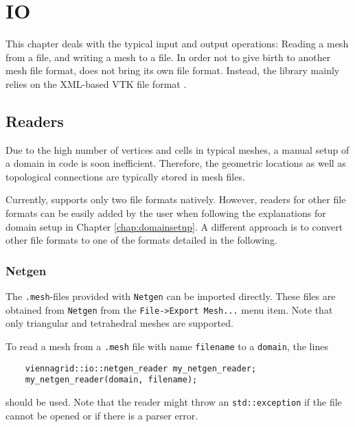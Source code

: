 \chapter{IO} \label{chap:io}
This chapter deals with the typical input and output operations: Reading a mesh from a file, and writing a mesh to a file.
In order not to give birth to another mesh file format, {\ViennaGrid} does not bring its own file format. 
Instead, the library mainly relies on the XML-based VTK \cite{VTK} file format \cite{VTKfileformat}.




\section{Readers}
Due to the high number of vertices and cells in typical meshes,
a manual setup of a domain in code is soon inefficient. Therefore,
the geometric locations as well as topological connections are typically stored in mesh files.

Currently, {\ViennaGrid} supports only two file formats natively. However, readers for other file formats
can be easily added by the user when following the explanations for domain setup in Chapter \ref{chap:domainsetup}.
A different approach is to convert other file formats to one of the formats detailed in the following.


 \subsection{Netgen}
 The \texttt{.mesh}-files provided with \texttt{Netgen} \cite{netgen} can be imported directly.
 These files are obtained from \texttt{Netgen} from the \texttt{File->Export Mesh...} menu item. Note that only triangular and tetrahedral meshes are supported.

 To read a mesh from a \texttt{.mesh} file with name \lstinline|filename| to a \lstinline|domain|, the lines
 \begin{lstlisting}
    viennagrid::io::netgen_reader my_netgen_reader;
    my_netgen_reader(domain, filename);
 \end{lstlisting}
 should be used. Note that the reader might throw an \lstinline|std::exception| if the file cannot be opened or if there is a parser error.

